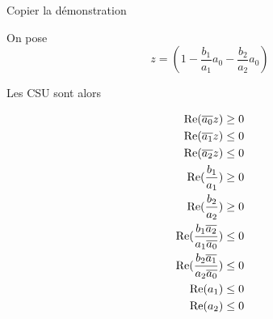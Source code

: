 			\begin{TODO}
			  Copier la démonstration
			\end{TODO}

			On pose 
			\begin{equation}
				z = \left(1 - \frac{b_1}{a_1}a_0 - \frac{b_2}{a_2}a_0\right)
			\end{equation}

			Les CSU sont alors

			\begin{align}
				\operatorname{Re}({\overline{a_0}}z) \ge 0 \\
				\operatorname{Re}({\overline{a_1}}z) \le 0 \\
				\operatorname{Re}({\overline{a_2}}z) \le 0 \\
				\operatorname{Re}(\dfrac{b_1}{a_1}) \ge 0 \\
				\operatorname{Re}(\dfrac{b_2}{a_2}) \ge 0 \\
				\operatorname{Re}(\dfrac{b_1{\overline{a_2}}}{a_1{\overline{a_0}}}) \le 0 \\
				\operatorname{Re}(\dfrac{b_2{\overline{a_1}}}{a_2{\overline{a_0}}}) \le 0 \\
				\operatorname{Re}(a_1) \le 0 \\
				\operatorname{Re}(a_2) \le 0
			\end{align}